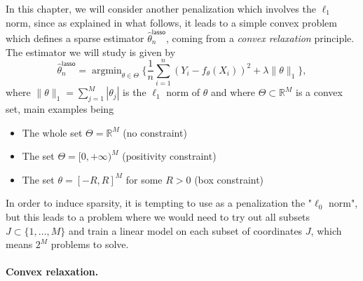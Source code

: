 \documentclass[
	fontsize=11pt, %
	twoside=false, %
	numbers=noenddot, %
]{kaobook}
\DeclareMathOperator*{\argmin}{argmin}
\newcommand{\R}{\mathbb R}
\newcommand{\wh}{\widehat}
\newcommand{\norm}[1]{\| #1 \|}
\begin{document}
In this chapter, we will consider another penalization which involves the $\ell_1$ norm, since as explained in what follows, it leads to a simple convex problem which defines a sparse estimator $\wh \theta_n^{\mathsf{lasso}}$, coming from a \emph{convex relaxation} principle.
The estimator we will study is given by
\begin{equation}
	\label{eq:lasso-def}
		\wh \theta_n^{\mathsf{lasso}} = \argmin_{\theta \in \Theta} 
		\Big\{ \frac 1n \sum_{i=1}^n (Y_i - f_\theta(X_i))^2 + \lambda \norm{\theta}_1 \Big\},
\end{equation}
where $\norm{\theta}_1 = \sum_{j=1}^M |\theta_j|$ is the $\ell_1$ norm of $\theta$ and where $\Theta \subset \R^M$ is a convex set, main examples being
\begin{itemize}
 	\item The whole set $\Theta = \R^M$ (no constraint)
 	\item The set $\Theta = [0, +\infty)^M$ (positivity constraint)
 	\item The set $\theta = [-R, R]^M$ for some $R > 0$ (box constraint)
 \end{itemize}

In order to induce sparsity, it is tempting to use as a penalization the "$\ell_0$ norm", but this leads to a problem where we would need to try out all subsets $J \subset \{ 1, \ldots, M \}$ and train a linear model on each subset of coordinates $J$, which means $2^M$ problems to solve.

\paragraph{Convex relaxation.} %
\end{document}
